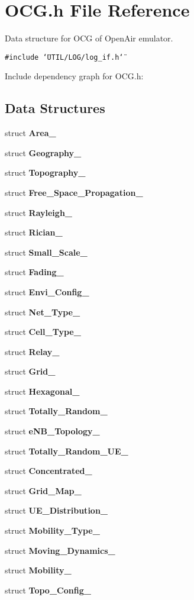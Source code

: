 \section{OCG.h File Reference}
\label{OCG_8h}
Data structure for OCG of OpenAir emulator.  


{\tt \#include \char`\"{}UTIL/LOG/log\_\-if.h\char`\"{}}\par


Include dependency graph for OCG.h:\subsection*{Data Structures}
\begin{CompactItemize}
\item 
struct {\bf Area\_\-}
\item 
struct {\bf Geography\_\-}
\item 
struct {\bf Topography\_\-}
\item 
struct {\bf Free\_\-Space\_\-Propagation\_\-}
\item 
struct {\bf Rayleigh\_\-}
\item 
struct {\bf Rician\_\-}
\item 
struct {\bf Small\_\-Scale\_\-}
\item 
struct {\bf Fading\_\-}
\item 
struct {\bf Envi\_\-Config\_\-}
\item 
struct {\bf Net\_\-Type\_\-}
\item 
struct {\bf Cell\_\-Type\_\-}
\item 
struct {\bf Relay\_\-}
\item 
struct {\bf Grid\_\-}
\item 
struct {\bf Hexagonal\_\-}
\item 
struct {\bf Totally\_\-Random\_\-}
\item 
struct {\bf eNB\_\-Topology\_\-}
\item 
struct {\bf Totally\_\-Random\_\-UE\_\-}
\item 
struct {\bf Concentrated\_\-}
\item 
struct {\bf Grid\_\-Map\_\-}
\item 
struct {\bf UE\_\-Distribution\_\-}
\item 
struct {\bf Mobility\_\-Type\_\-}
\item 
struct {\bf Moving\_\-Dynamics\_\-}
\item 
struct {\bf Mobility\_\-}
\item 
struct {\bf Topo\_\-Config\_\-}
\item 

\end{CompactItemize}
